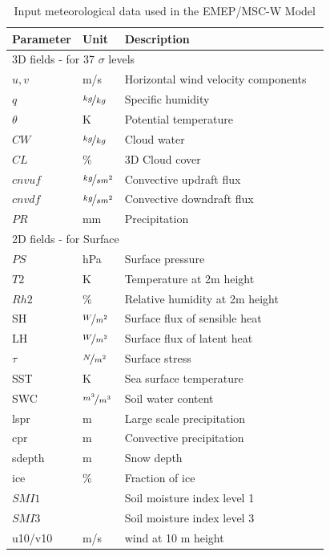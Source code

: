 \documentclass[a4paper,12pt]{report}
\begin{document}
\newpage
\begin{table}[h!]
\caption{Input meteorological data used in the EMEP/MSC-W Model
   \label{Tab:metinput}}
\begin{center}
\begin{tabular}{p{6cm}lll}
\hline
Parameter      & Unit & Description          \\
\hline
\multicolumn{3}{l}{3D fields - for 37 $\sigma$ levels} \\
$u,v$  &  m/s     & Horizontal wind velocity components   \\
$q$    &  $\nicefrac{kg}{kg}$   & Specific humidity           \\
$\theta$       & K  & Potential temperature \\
$CW$             & $\nicefrac{kg}{kg}$ & Cloud water          \\
$CL$             & \% & 3D Cloud cover            \\
$cnvuf$          & $\nicefrac{kg}{sm^2}$ & Convective updraft flux \\
$cnvdf$          & $\nicefrac{kg}{sm^2}$ & Convective downdraft flux \\
$PR$             & mm & Precipitation         \\
\hline
\multicolumn{3}{l}{2D fields - for Surface} \\
$PS$             & hPa & Surface pressure                     \\
$T2$          & K  & Temperature at 2m height               \\
$Rh2$             & \% & Relative humidity at 2m height \\
SH              &  $\nicefrac{W}{m^{2}}$ & Surface flux of sensible heat \\
LH             & $\nicefrac{W}{m^{2}}$ & Surface flux of latent heat \\
$\tau$         & $\nicefrac{N}{m^{2}}$ & Surface stress               \\
SST            & K & Sea surface temperature \\
SWC            & $\nicefrac{m^{3}}{m^{3}}$ & Soil water content      \\
lspr             & m & Large scale precipitation \\
cpr              & m & Convective precipitation \\
sdepth         & m & Snow depth \\
ice            & \% & Fraction of ice \\  
$SMI1$           &    & Soil moisture index level 1 \\
$SMI3$           &    & Soil moisture index level 3 \\
u10/v10        & m/s  & wind at 10 m height \\
\hline
\end{tabular}\\
\end{center}
\end{table}
\end{document}
